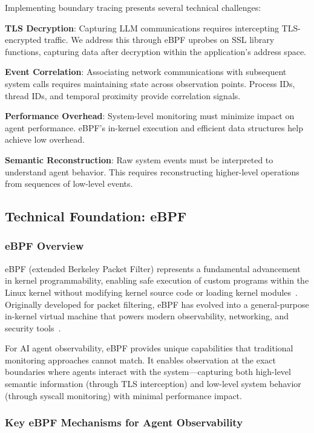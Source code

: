 \documentclass[sigplan,screen，review,9pt]{acmart}
\begin{document}
Implementing boundary tracing presents several technical challenges:

\textbf{TLS Decryption}: Capturing LLM communications requires intercepting TLS-encrypted traffic. We address this through eBPF uprobes on SSL library functions, capturing data after decryption within the application's address space.

\textbf{Event Correlation}: Associating network communications with subsequent system calls requires maintaining state across observation points. Process IDs, thread IDs, and temporal proximity provide correlation signals.

\textbf{Performance Overhead}: System-level monitoring must minimize impact on agent performance. eBPF's in-kernel execution and efficient data structures help achieve low overhead.

\textbf{Semantic Reconstruction}: Raw system events must be interpreted to understand agent behavior. This requires reconstructing higher-level operations from sequences of low-level events.

\subsection{Technical Foundation: eBPF}

\subsubsection{eBPF Overview}

eBPF (extended Berkeley Packet Filter) represents a fundamental advancement in kernel programmability, enabling safe execution of custom programs within the Linux kernel without modifying kernel source code or loading kernel modules~\cite{brendangregg}. Originally developed for packet filtering, eBPF has evolved into a general-purpose in-kernel virtual machine that powers modern observability, networking, and security tools~\cite{ebpfio,cilium}.

For AI agent observability, eBPF provides unique capabilities that traditional monitoring approaches cannot match. It enables observation at the exact boundaries where agents interact with the system—capturing both high-level semantic information (through TLS interception) and low-level system behavior (through syscall monitoring) with minimal performance impact.

\subsubsection{Key eBPF Mechanisms for Agent Observability}
\end{document}
